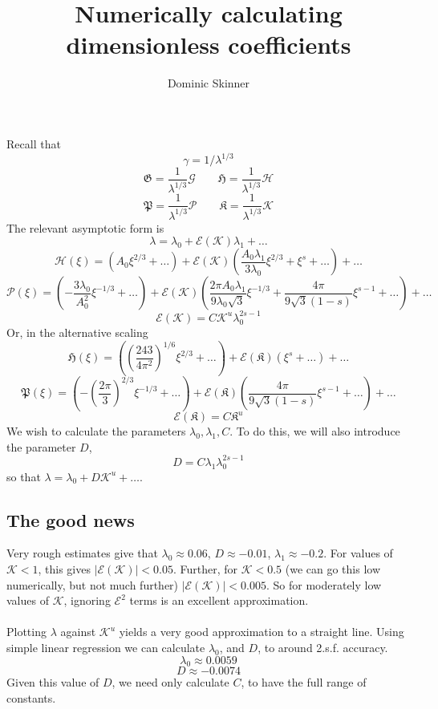 \documentclass{article}
\newcommand{\cE}{\mathcal{E}}
\newcommand{\fP}{\mathfrak{P}}
\newcommand{\fH}{\mathfrak{H}}
\newcommand{\fG}{\mathfrak{G}}
\newcommand{\fK}{\mathfrak{K}}
\newcommand{\sP}{\mathscr{P}}
\newcommand{\sH}{\mathscr{H}}
\newcommand{\sG}{\mathscr{G}}
\newcommand{\sK}{\mathscr{K}}
\begin{document}
\title{Numerically calculating dimensionless coefficients}
\author{Dominic Skinner}
\maketitle
Recall that
\[\gamma = 1/\lambda^{1/3} \]
\[\fG = \frac{1}{\lambda^{1/3}} \sG \qquad \fH = \frac{1}{\lambda^{1/3}} \sH\]
\[\fP = \frac{1}{\lambda^{1/3}} \sP \qquad \fK = \frac{1}{\lambda^{1/3}} \sK\]
The relevant asymptotic form is
\[ \lambda = \lambda_0 + \cE(\sK)\lambda_1 + \dots \]
%
\[ \sH(\xi) = (A_0\xi^{2/3}+\dots) + \cE(\sK)\left(\frac{A_0 \lambda_1}
{3 \lambda_0} \xi^{2/3} + \xi^s + \dots \right) + \dots \]
%
\[ \sP(\xi) = (-\frac{3\lambda_0}{A_0^2}\xi^{-1/3}+\dots) + \cE(\sK)
\left(\frac{2\pi A_0 \lambda_1}{9 \lambda_0 \sqrt{3}} \xi^{-1/3} + 
\frac{4\pi}{9\sqrt{3}(1-s)}\xi^{s-1} + \dots \right) + \dots \]
%
\[ \cE(\sK) = C \sK^u \lambda_0^{2s-1}\]
Or, in the alternative scaling
\[ \fH(\xi) = \left( \left(\frac{243}{4\pi^2}\right)^{1/6} \xi^{2/3}+\dots
\right) + \cE(\fK)\left( \xi^s + \dots \right) + \dots \]
%
\[ \fP(\xi) = \left(-\left( \frac{2\pi}{3} \right)^{2/3} 
\xi^{-1/3}+\dots \right) + \cE(\fK)
\left( \frac{4\pi}{9\sqrt{3}(1-s)}\xi^{s-1} + \dots \right) + \dots \]
%
\[ \cE(\fK) = C \fK^u\]
We wish to calculate the parameters $\lambda_0, \lambda_1, C$. To do this, we
will also introduce the parameter $D$,
\[ D = C \lambda_1 \lambda_0^{2s-1} \]
so that $\lambda = \lambda_0 + D \sK ^u+ \dots$.
%
\subsection*{The good news}
Very rough estimates give that $\lambda_0 \approx 0.06$, $D \approx - 0.01$,
$\lambda_1 \approx -0.2$.
For values of $\sK < 1$, this gives $|\cE(\sK)| < 0.05$. Further, for 
$\sK < 0.5$ (we can go this low numerically, but not much further)
$|\cE(\sK)| < 0.005$. So for moderately low values of $\sK$, ignoring 
$\cE^2$ terms is an excellent approximation.
\\
\\
Plotting $\lambda$ against $\sK^u$ yields a very good approximation to a 
straight line. Using simple linear regression we can calculate $\lambda_0$,
and $D$, to around 2.s.f. accuracy.
\[ \lambda_0 \approx 0.0059 \]
\[ D \approx - 0.0074 \]
Given this value of $D$, we need only calculate $C$, to have the full range
of constants.
%
\end{document}
